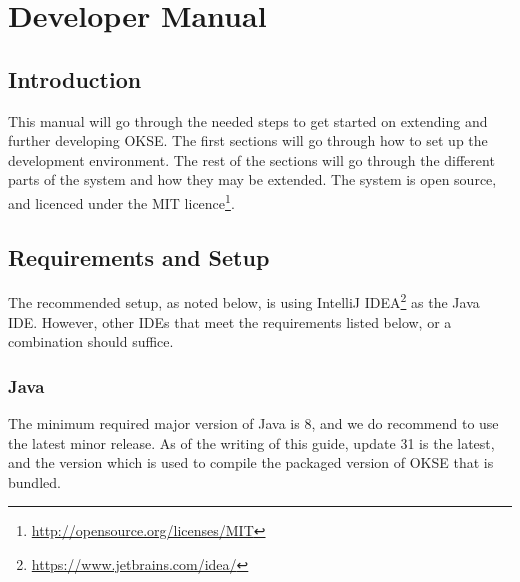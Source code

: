 
 
 
\lstset{style=mystyle}

\chapter{Developer Manual}
\label{appendix-developer-manual}

\section{Introduction}

This manual will go through the needed steps to get started on extending and further developing OKSE. The first sections will go through how to set up the development environment. The rest of the sections will go through the different parts of the system and how they may be extended. The system is open source, and licenced under the MIT licence\footnote{\url{http://opensource.org/licenses/MIT}}.

\section{Requirements and Setup}
The recommended setup, as noted below, is using IntelliJ IDEA\footnote{\url{https://www.jetbrains.com/idea/}} as the Java IDE. However, other IDEs that meet the requirements listed below, or a combination should suffice. 

\subsection{Java}
The minimum required major version of Java is 8, and we do recommend to use the latest minor release. As of the writing of this guide, update 31 is the latest, and the version which is used to compile the packaged version of OKSE that is bundled.

